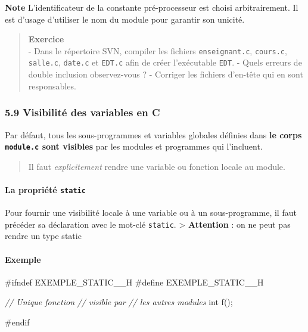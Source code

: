 \documentclass[11pt]{article}
\newenvironment{Shaded}{}{}
\newcommand{\DataTypeTok}[1]{\textcolor[rgb]{0.56,0.13,0.00}{{#1}}}
\newcommand{\CommentTok}[1]{\textcolor[rgb]{0.38,0.63,0.69}{\textit{{#1}}}}
\newcommand{\NormalTok}[1]{{#1}}
\newcommand{\PreprocessorTok}[1]{\textcolor[rgb]{0.74,0.48,0.00}{{#1}}}
\begin{document}
\textbf{Note} L'identificateur de la constante pré-processeur est choisi
arbitrairement. Il est d'usage d'utiliser le nom du module pour garantir
son unicité.

    \begin{quote}
\textbf{Exercice}\\
- Dans le répertoire SVN, compiler les fichiers \texttt{enseignant.c},
\texttt{cours.c}, \texttt{salle.c}, \texttt{date.c} et \texttt{EDT.c}
afin de créer l'exécutable \texttt{EDT}. - Quels erreurs de double
inclusion observez-vous ? - Corriger les fichiers d'en-tête qui en sont
responsables.
\end{quote}

    \subsubsection{5.9 Visibilité des variables en
C}\label{visibilituxe9-des-variables-en-c}

Par défaut, tous les sous-programmes et variables globales définies dans
\textbf{le corps \texttt{module.c} sont visibles} par les modules et
programmes qui l'incluent.

\begin{quote}
Il faut \emph{explicitement} rendre une variable ou fonction locale au
module.
\end{quote}

\paragraph{\texorpdfstring{La propriété
\texttt{static}}{La propriété static}}\label{la-propriuxe9tuxe9-static}

Pour fournir une visibilité locale à une variable ou à un
sous-programme, il faut précéder sa déclaration avec le mot-clé
\texttt{static}. \textgreater{} \textbf{Attention} : on ne peut pas
rendre un type static

\paragraph{Exemple}\label{exemple}

\begin{Shaded}
\begin{Highlighting}[]
\PreprocessorTok{#ifndef EXEMPLE_STATIC__H}
\PreprocessorTok{#define EXEMPLE_STATIC__H}

\CommentTok{// Unique fonction}
\CommentTok{// visible par}
\CommentTok{// les autres modules}
\DataTypeTok{int}\NormalTok{ f();}

\PreprocessorTok{#endif}
\end{Highlighting}
\end{Shaded}
\end{document}
